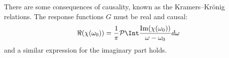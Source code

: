 There are some consequences of causality, known as the Kramers--Kr\"onig relations. The response functions $G$ must be real and causal:
\begin{equation}
    \Re(\chi(\omega_0)) =\frac{1}{\pi} \mathcal{P}\Int \frac{\text{Im}(\chi(\omega_0))}{\omega-\omega_0}d\omega
\end{equation}
and a similar expression for the imaginary part holds.